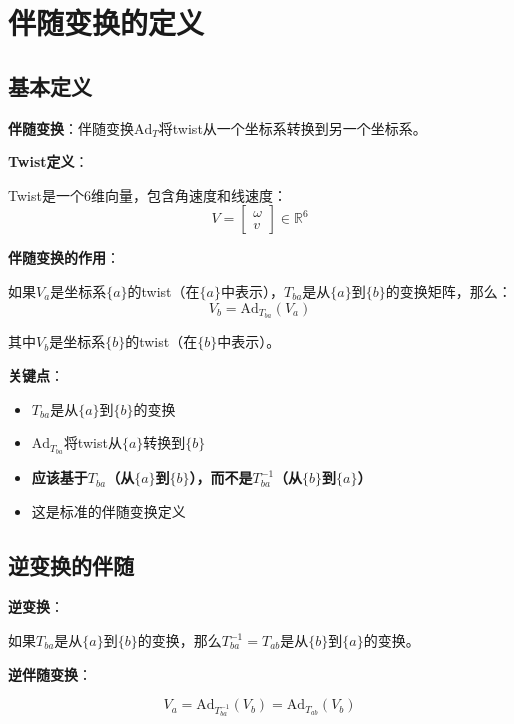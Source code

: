 \documentclass[12pt,a4paper]{article}
\begin{document}
\section{伴随变换的定义}

\subsection{基本定义}

\textbf{伴随变换}：伴随变换$\text{Ad}_T$将twist从一个坐标系转换到另一个坐标系。

\textbf{Twist定义}：

Twist是一个6维向量，包含角速度和线速度：
\begin{equation}
V = \begin{bmatrix} \omega \\ v \end{bmatrix} \in \mathbb{R}^6
\end{equation}

\textbf{伴随变换的作用}：

如果$V_a$是坐标系$\{a\}$的twist（在$\{a\}$中表示），$T_{ba}$是从$\{a\}$到$\{b\}$的变换矩阵，那么：
\begin{equation}
V_b = \text{Ad}_{T_{ba}}(V_a)
\end{equation}

其中$V_b$是坐标系$\{b\}$的twist（在$\{b\}$中表示）。

\textbf{关键点}：
\begin{itemize}
\item $T_{ba}$是从$\{a\}$到$\{b\}$的变换
\item $\text{Ad}_{T_{ba}}$将twist从$\{a\}$转换到$\{b\}$
\item \textbf{应该基于$T_{ba}$（从$\{a\}$到$\{b\}$），而不是$T_{ba}^{-1}$（从$\{b\}$到$\{a\}$）}
\item 这是标准的伴随变换定义
\end{itemize}

\subsection{逆变换的伴随}

\textbf{逆变换}：

如果$T_{ba}$是从$\{a\}$到$\{b\}$的变换，那么$T_{ba}^{-1} = T_{ab}$是从$\{b\}$到$\{a\}$的变换。

\textbf{逆伴随变换}：

\begin{equation}
V_a = \text{Ad}_{T_{ba}^{-1}}(V_b) = \text{Ad}_{T_{ab}}(V_b)
\end{equation}
\end{document}
